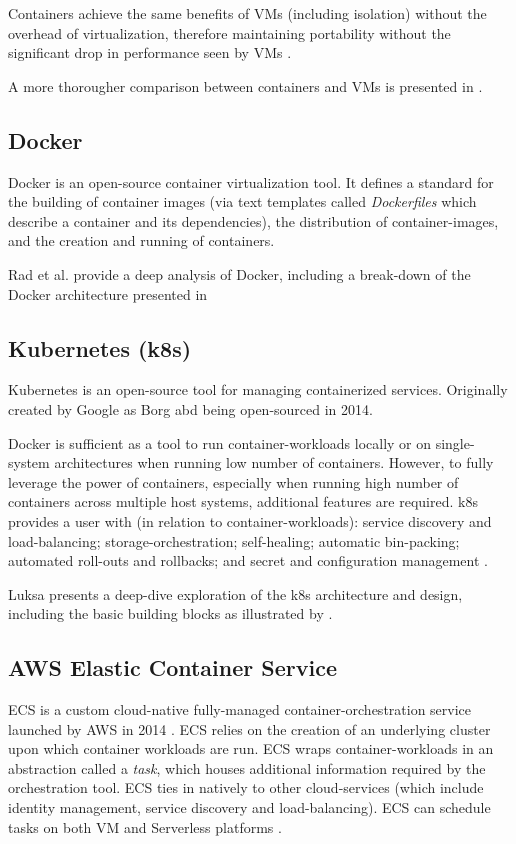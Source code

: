 Containers achieve the same benefits of VMs (including isolation) without the overhead of virtualization, therefore maintaining portability 
without the significant drop in performance seen by VMs \cite{POTDAR20201419}.

A more thorougher comparison between containers and VMs is presented in \cite[Table 1]{6903537}.

\subsection{Docker}
Docker \cite{docker} is an open-source container virtualization tool. 
It defines a standard for the building of container images (via text templates called \textit{Dockerfiles} which describe a container and its dependencies),
the distribution of container-images, and the creation and running of containers\cite{7093032}.

Rad et al. \cite{rad2017introduction} provide a deep analysis of Docker, including a break-down of the Docker architecture presented in \cite[Fig. 1]{rad2017introduction}

\subsection{Kubernetes (k8s)}
Kubernetes \cite{kubernetes} is an open-source tool for managing containerized services. 
Originally created by Google as Borg \cite{10.1145/2741948.2741964} abd being open-sourced in 2014\cite{metz_2014}. 

Docker is sufficient as a tool to run container-workloads locally or on single-system architectures when running low number of containers.
However, to fully leverage the power of containers, especially when running high number of containers across multiple host systems, additional features are required.
k8s provides a user with (in relation to container-workloads): service discovery and load-balancing; storage-orchestration; self-healing; automatic bin-packing; automated roll-outs and rollbacks; 
and secret and configuration management \cite{kubernetes_2022}.

Luksa \cite{luksa2017kubernetes} presents a deep-dive exploration of the k8s architecture and design, including the basic building blocks as illustrated by \cite[Figure 1.9]{luksa2017kubernetes}.


\subsection{AWS Elastic Container Service}
ECS is a custom cloud-native fully-managed container-orchestration service launched by AWS in 2014 \cite{ecs}.
ECS relies on the creation of an underlying cluster upon which container workloads are run.
ECS wraps container-workloads in an abstraction called a \textit{task}, which houses additional information required by the orchestration tool.
ECS ties in natively to other cloud-services (which include identity management, service discovery and load-balancing).
ECS can schedule tasks on both VM and Serverless platforms \cite{ecs_2022}.


